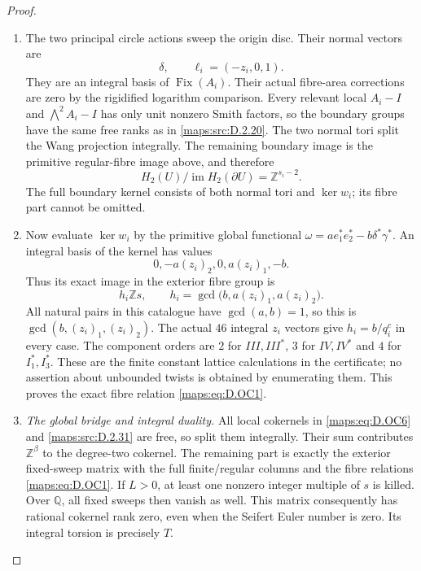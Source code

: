 \begin{proof}
\begin{enumerate}[label=\arabic*.,leftmargin=*]
\item The two principal circle actions sweep the origin disc.
Their normal vectors are
\[
 \delta,\qquad \ell_i=(-z_i,0,1).
\]
They are an integral basis of $\operatorname{Fix}(A_i)$.
Their actual fibre-area corrections are zero by the
rigidified logarithm comparison. Every relevant local
$A_i-I$ and $\bigwedge^2 A_i-I$ has only unit nonzero Smith
factors, so the boundary groups have the same free ranks
as in \ref{maps:src:D.2.20}. The two normal tori split the Wang projection
integrally. The remaining boundary image is the primitive
regular-fibre image above, and therefore
\[
 H_2(U)/\operatorname{im}H_2(\partial U)
                        =\mathbb Z^{s_i-2}.                \tag{D.OC6}\label{maps:eq:D.OC6}
\]
The full boundary kernel consists of both normal tori and
$\ker w_i$; its fibre part cannot be omitted.

\item Now evaluate $\ker w_i$ by the primitive global functional
$\omega=a e_1^*e_2^*-b\delta^*\gamma^*$.
An integral basis of the kernel has values
\[
 0,-a(z_i)_2,0,a(z_i)_1,-b.
\]
Thus its exact image in the exterior fibre group is
\[
 h_i\mathbb Zs,\qquad
 h_i=\gcd\bigl(b,a(z_i)_1,a(z_i)_2\bigr).
                                                               \tag{D.OC7}\label{maps:eq:D.OC7}
\]
All natural pairs in this catalogue have $\gcd(a,b)=1$,
so this is $\gcd(b,(z_i)_1,(z_i)_2)$.
The actual $46$ integral $z_i$ vectors give
$h_i=b/q_i^c$ in every case. The component orders are
$2$ for $III,III^*$, $3$ for $IV,IV^*$ and $4$ for
$I_1^*,I_3^*$. These are the finite constant lattice
calculations in the certificate; no assertion about
unbounded twists is obtained by enumerating them.
This proves the exact fibre relation \eqref{maps:eq:D.OC1}.

\item \emph{The global bridge and integral duality.}
All local cokernels in \eqref{maps:eq:D.OC6} and \ref{maps:src:D.2.31} are free,
so split them integrally. Their sum contributes
$\mathbb Z^\beta$ to the degree-two cokernel.
The remaining part is exactly the exterior fixed-sweep
matrix with the full finite/regular columns and the fibre
relations \eqref{maps:eq:D.OC1}. If $L>0$, at least one nonzero integer
multiple of $s$ is killed. Over $\mathbb Q$, all fixed
sweeps then vanish as well. This matrix consequently has
rational cokernel rank zero, even when the Seifert Euler
number is zero. Its integral torsion is precisely $T$.


\end{enumerate}
\end{proof}
